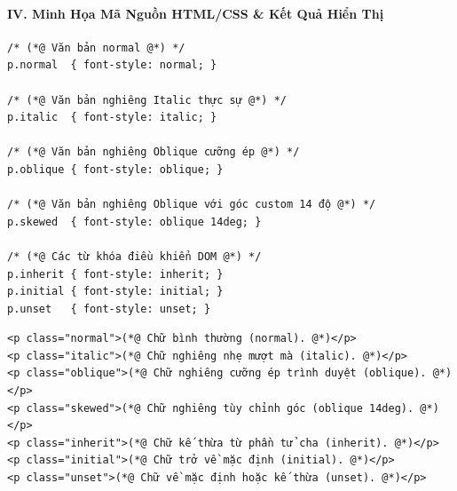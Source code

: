 \documentclass[11pt,oneside]{book}
\begin{document}
\paragraph*{IV. Minh Họa Mã Nguồn HTML/CSS \& Kết Quả Hiển Thị}

\begin{codeWindow}
\begin{lstlisting}[language=CSS3]
/* (*@ Văn bản normal @*) */
p.normal  { font-style: normal; }

/* (*@ Văn bản nghiêng Italic thực sự @*) */
p.italic  { font-style: italic; }

/* (*@ Văn bản nghiêng Oblique cưỡng ép @*) */
p.oblique { font-style: oblique; }

/* (*@ Văn bản nghiêng Oblique với góc custom 14 độ @*) */
p.skewed  { font-style: oblique 14deg; }

/* (*@ Các từ khóa điều khiển DOM @*) */
p.inherit { font-style: inherit; }
p.initial { font-style: initial; }
p.unset   { font-style: unset; }
\end{lstlisting}
\end{codeWindow}

\begin{codeWindow}
\begin{lstlisting}[language=HTML5]
<p class="normal">(*@ Chữ bình thường (normal). @*)</p>
<p class="italic">(*@ Chữ nghiêng nhẹ mượt mà (italic). @*)</p>
<p class="oblique">(*@ Chữ nghiêng cưỡng ép trình duyệt (oblique). @*)</p>
<p class="skewed">(*@ Chữ nghiêng tùy chỉnh góc (oblique 14deg). @*)</p>
<p class="inherit">(*@ Chữ kế thừa từ phần tử cha (inherit). @*)</p>
<p class="initial">(*@ Chữ trở về mặc định (initial). @*)</p>
<p class="unset">(*@ Chữ về mặc định hoặc kế thừa (unset). @*)</p>
\end{lstlisting}
\end{codeWindow}
\end{document}
